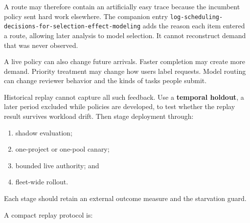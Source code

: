 A route may therefore contain an artificially easy trace because the incumbent policy sent hard work elsewhere. The companion entry \texttt{log-scheduling-decisions-for-selection-effect-modeling} adds the reason each item entered a route, allowing later analysis to model selection. It cannot reconstruct demand that was never observed.

A live policy can also change future arrivals. Faster completion may create more demand. Priority treatment may change how users label requests. Model routing can change reviewer behavior and the kinds of tasks people submit.


Historical replay cannot capture all such feedback. Use a \textbf{temporal holdout}, a later period excluded while policies are developed, to test whether the replay result survives workload drift. Then stage deployment through:

\begin{enumerate}
\def\labelenumi{\arabic{enumi}.}
\tightlist
\item
  shadow evaluation;
\item
  one-project or one-pool canary;
\item
  bounded live authority; and
\item
  fleet-wide rollout.
\end{enumerate}

Each stage should retain an external outcome measure and the starvation guard.


A compact replay protocol is:

